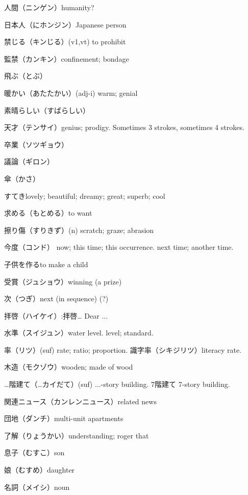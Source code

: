 人間（ニンゲン）humanity?

日本人（にホンジン）Japanese person

禁じる（キンじる）(v1,vt) to prohibit

監禁（カンキン）confinement; bondage


飛ぶ（とぶ）

暖かい（あたたかい）(adj-i) warm; genial

素晴らしい（すばらしい）

天才（テンサイ）genius; prodigy.
Sometimes 3 strokes, sometimes 4 strokes.

卒業（ソツギョウ）

議論（ギロン）

傘（かさ）

すてきlovely; beautiful; dreamy; great; superb; cool

求める（もとめる）to want

擦り傷（すりきず）(n) scratch; graze; abrasion

今度（コンド）
now; this time; this occurrence.
next time; another time.

子供を作るto make a child

受賞（ジュショウ）winning (a prize)

次（つぎ）next (in sequence) (?)

拝啓（ハイケイ）:拝啓… Dear ...

水準（スイジュン）water level. level; standard.

率（リツ）(suf) rate; ratio; proportion.
識字率（シキジリツ）literacy rate.

木造（モクゾウ）wooden; made of wood

…階建て（…カイだて）(suf) ...-story building.
7階建て 7-story building.

関連ニュース（カンレンニュース）related news

団地（ダンチ）multi-unit apartments

了解（りょうかい）understanding; roger that

息子（むすこ）son

娘（むすめ）daughter

名詞（メイシ）noun
